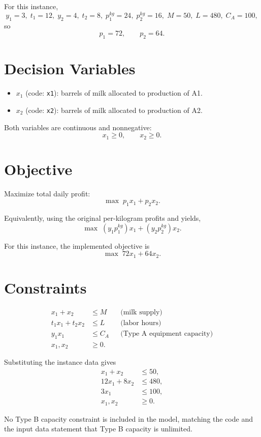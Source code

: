 For this instance,
\[
y_1=3,\; t_1=12,\; y_2=4,\; t_2=8,\; p_1^{kg}=24,\; p_2^{kg}=16,\; M=50,\; L=480,\; C_A=100,
\]
so
\[
p_1=72,\qquad p_2=64.
\]

\section*{Decision Variables}

\begin{itemize}
    \item $x_1$ (code: \texttt{x1}): barrels of milk allocated to production of A1.
    \item $x_2$ (code: \texttt{x2}): barrels of milk allocated to production of A2.
\end{itemize}

Both variables are continuous and nonnegative:
\[
x_1 \ge 0,\qquad x_2 \ge 0.
\]

\section*{Objective}

Maximize total daily profit:
\[
\max \; p_1 x_1 + p_2 x_2.
\]

Equivalently, using the original per-kilogram profits and yields,
\[
\max \; (y_1 p_1^{kg})x_1 + (y_2 p_2^{kg})x_2.
\]

For this instance, the implemented objective is
\[
\max \; 72x_1 + 64x_2.
\]

\section*{Constraints}

\begin{align}
x_1 + x_2 &\le M
&&\text{(milk supply)} \\
t_1 x_1 + t_2 x_2 &\le L
&&\text{(labor hours)} \\
y_1 x_1 &\le C_A
&&\text{(Type A equipment capacity)} \\
x_1, x_2 &\ge 0.
\end{align}

Substituting the instance data gives
\begin{align}
x_1 + x_2 &\le 50,\\
12x_1 + 8x_2 &\le 480,\\
3x_1 &\le 100,\\
x_1, x_2 &\ge 0.
\end{align}

No Type B capacity constraint is included in the model, matching the code and the input data statement that Type B capacity is unlimited.

